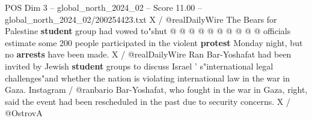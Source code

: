 \begin{textsample}{POS Dim 3 – global\_north\_2024\_02 – Score 11.00 – global\_north\_2024\_02/200254423.txt}
X / @realDailyWire The Bears for Palestine \textbf{student} group had vowed to"shut @ @ @ @ @ @ @ @ @ @ officials estimate some 200 people participated in the violent \textbf{protest} Monday night, but no \textbf{arrests} have been made.
X / @realDailyWire Ran Bar-Yoshafat had been invited by Jewish \textbf{student} groups to discuss Israel ' s"international legal challenges"and whether the nation is violating international law in the war in Gaza.
Instagram / @ranbario Bar-Yoshafat, who fought in the war in Gaza, right, said the event had been rescheduled in the past due to security concerns.
X / @OstrovA

\end{textsample}
